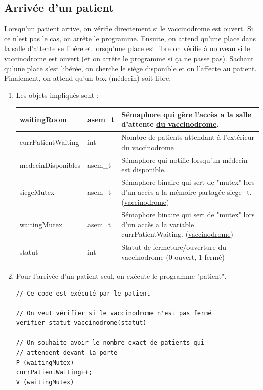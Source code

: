\documentclass[a4paper]{article}
\begin{document}
\subsection{Arrivée d'un patient}\label{arrivee-patient}

    Lorsqu'un patient arrive, on vérifie directement si le vaccinodrome est ouvert. Si ce n'est pas le cas, on arrête le programme. Ensuite, on attend qu'une place dans la salle d'attente se libère et lorsqu'une place est libre on vérifie à nouveau si le vaccinodrome est ouvert (et on arrête le programme si ça ne passe pas). Sachant qu'une place s'est libérée, on cherche le siège disponible et on l'affecte au patient.
    Finalement, on attend qu'un box (médecin) soit libre.

  \begin{enumerate}
  \item Les objets impliqués sont :

    \begin{tabularx}{\linewidth}{|l|l|>{\strut}X|}
      \hline%
      waitingRoom & asem\_t & Sémaphore qui gère l'accès a la salle d'attente \underline{du vaccinodrome}. \\ \hline%
      currPatientWaiting & int & Nombre de patients attendant à l'extérieur \underline{du vaccinodrome} \\ \hline%
      medecinDisponibles & asem\_t & Sémaphore qui notifie lorsqu'un médecin est disponible. \\ \hline%
      siegeMutex & asem\_t & Sémaphore binaire qui sert de "mutex" lors d'un accès a la mémoire partagée siege\_t. (\underline{vaccinodrome}) \\ \hline%
    waitingMutex & asem\_t & Sémaphore binaire qui sert de "mutex" lors d'un accès a la variable currPatientWaiting. (\underline{vaccinodrome}) \\ \hline%
    statut & int & Statut de fermeture/ouverture du vaccinodrome (0 ouvert, 1 fermé) \\ \hline%
    \end{tabularx}

  \item Pour l'arrivée d'un patient seul, on exécute le programme "patient".

\begin{verbatim}
// Ce code est exécuté par le patient

// On veut vérifier si le vaccinodrome n'est pas fermé
verifier_statut_vaccinodrome(statut)

// On souhaite avoir le nombre exact de patients qui
// attendent devant la porte
P (waitingMutex)
currPatientWaiting++;
V (waitingMutex)


\end{verbatim}
\end{enumerate}
\end{document}
